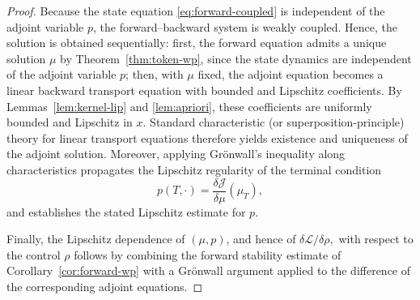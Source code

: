 \documentclass[11pt,a4wide]{article}
\theoremstyle{definition}
\begin{document}
\begin{proof}

Because the state equation \eqref{eq:forward-coupled} is independent of the adjoint variable $p$, the forward--backward system is  weakly coupled. Hence, 
the solution is obtained sequentially: first, the forward
equation admits a unique solution $\mu$ by Theorem~\ref{thm:token-wp},
since the state dynamics are independent of the adjoint variable $p$;
then, with $\mu$ fixed, the adjoint equation becomes a linear backward
transport equation with bounded and Lipschitz coefficients. 
By Lemmas~\ref{lem:kernel-lip} and \ref{lem:apriori}, these coefficients are uniformly bounded and Lipschitz in $x$. Standard characteristic (or superposition-principle) theory for linear transport equations therefore yields existence and uniqueness of the adjoint solution. Moreover, applying Gr\"onwall's inequality along characteristics propagates the Lipschitz regularity of the terminal condition
\[
p(T,\cdot)=\frac{\delta\mathcal J}{\delta\mu}(\mu_T),
\]
and establishes the stated Lipschitz estimate for $p$.

Finally, the Lipschitz dependence of $(\mu,p)$, and hence of
\(
\delta\mathcal L/\delta\rho,
\)
with respect to the control $\rho$ follows by combining the forward stability estimate of Corollary~\ref{cor:forward-wp} with a Gr\"onwall argument applied to the difference of the corresponding adjoint equations.
\end{proof}
\end{document}
